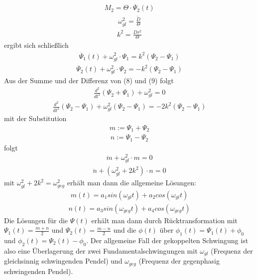 \documentclass[a4paper,10pt]{scrartcl}
\begin{document}
\begin{itemize}
\begin{itemize}
\begin{align*}
					M_{2}=\Theta \cdot \ddot{\Psi_{2}}(t)
					\end{align*}
					\begin{align*}
					\omega_{gl}^{2}=\frac{\tilde{D}}{\Theta}
					\end{align*}
					\begin{align*}
					k^{2}=\frac{Dr^{2}}{\Theta}
					\end{align*}
					ergibt sich schließlich
					\begin{align}
					\ddot{\Psi_{1}}(t)+\omega_{gl}^{2}\cdot \Psi_{1}=k^{2}(\Psi_{2}-\Psi_{1})
					\end{align}
					\begin{align}
					\ddot{\Psi_{2}}(t)+\omega_{gl}^{2}\cdot \Psi_{2}=-k^{2}(\Psi_{2}-\Psi_{1})
					\end{align}
					Aus der Summe und der Differenz von (8) und (9) folgt
					\begin{align}
					\frac{d^{2}}{dt^{2}}(\Psi_{2}+\Psi_{1})+\omega_{gl}^{2}=0
					\end{align}
					\begin{align}
					\frac{d^{2}}{dt^{2}}(\Psi_{2}-\Psi_{1})+\omega_{gl}^{2}(\Psi_{2}-\Psi_{1})=-2k^{2}(\Psi_{2}-\Psi_{1})
					\end{align}
					mit der Substitution
					\begin{align*}
					m:=\Psi_{1}+\Psi_{2}
					\end{align*}
					\begin{align*}
					n:=\Psi_{1}-\Psi_{2}
					\end{align*}
					folgt
					\begin{align}
					\ddot{m}+\omega_{gl}^{2}\cdot m=0
					\end{align}
					\begin{align}
					\ddot{n}+(\omega_{gl}^{2}+2k^{2})\cdot n = 0
					\end{align}
					mit \(\omega_{gl}^{2}+2k^{2}=\omega_{geg}^{2}\)
					erhält man dann die allgemeine Lösungen:
					\begin{align}
					m(t)=a_{1}sin(\omega_{gl}t)+a_{2}cos(\omega_{gl}t)
					\end{align}
					\begin{align}
					n(t)=a_{3}sin(\omega_{geg}t)+a_{4}cos(\omega_{geg}t)
					\end{align}
					\newpage
					Die Lösungen für die \(\Psi(t)\) erhält man dann durch Rücktransformation mit \(\Psi_{1}(t)=\frac{m+n}{2}\) und \(\Psi_{2}(t)=\frac{m-n}{2}\) und die \(\phi(t)\) über \(\phi_{1}(t)=\Psi_{1}(t)+\phi_{0}\) und \(\phi_{2}(t)=\Psi_{2}(t)-\phi_{0}\). Der allgemeine Fall der gekoppelten Schwingung ist also eine Überlagerung der zwei Fundamentalschwingungen mit \(\omega_{gl}\) (Frequenz der gleichsinnig schwingenden Pendel) und \(\omega_{geg}\) (Frequenz der gegenphasig schwingenden Pendel). 
				\end{itemize}
			
			\end{itemize}
\end{document}
